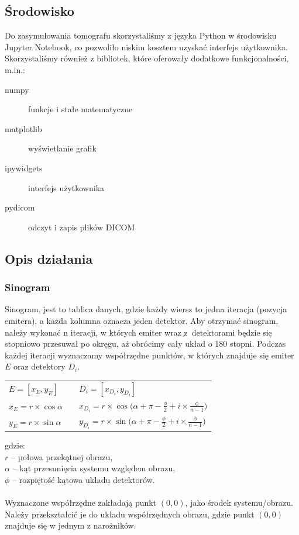 \documentclass[polish,polish,a4paper]{article}
\begin{document}
		\subsection{Środowisko}
			Do zasymulowania tomografu skorzystaliśmy z języka Python w środowisku Jupyter Notebook,
			 co pozwoliło niskim kosztem uzyskać interfejs użytkownika.
			 Skorzystaliśmy również z bibliotek, które oferowały dodatkowe funkcjonalności, m.in.:
			
			\begin{description}
				\item[numpy] funkcje i stałe matematyczne
				\item[matplotlib] wyświetlanie grafik
				\item[ipywidgets] interfejs użytkownika
				\item[pydicom] odczyt i zapis plików DICOM
			\end{description}
			
			\subsection{Opis działania}
				\subsubsection{Sinogram}
				
				Sinogram, jest to tablica danych, 
				gdzie każdy wiersz to jedna iteracja (pozycja emitera), 
				a każda kolumna oznacza jeden detektor.
				Aby otrzymać sinogram, należy wykonać n iteracji, 
				w których emiter wraz z~detektorami będzie się stopniowo przesuwał po okręgu, 
				aż obrócimy cały układ o 180 stopni. 
				Podczas każdej iteracji wyznaczamy współrzędne punktów, w których znajduje się emiter $E$ oraz detektory $D_i$.
				\begin{center}
					\begin{tabular} {l l l}
						$ E = [ x_E, y_E ] $ 	& \hspace{2cm}	 &	$ D_i = [x_{D_i}, y_{D_i}] $
						\\
						$ x_E = r \times \cos{\alpha} $ 	& \hspace{2cm}	 &	 $ x_{D_i} = r \times \cos{\big(\alpha + \pi - \frac{\phi}{2} + i \times \frac{\phi}{n-1}\big)} $
						 \\ 
						$ y_E = r \times \sin{\alpha} $ 	& \hspace{2cm}	 &	 $ y_{D_i} =  r \times \sin{\big(\alpha + \pi - \frac{\phi}{2} + i \times \frac{\phi}{n-1}\big)}$ 
						\\
					\end{tabular}
				\end{center}
				gdzie: \\
				\indent $r$ -- połowa przekątnej obrazu, \\
				\indent $\alpha$ -- kąt przesunięcia systemu względem obrazu, \\
				\indent $\phi$ -- rozpiętość kątowa układu detektorów. \\ \\
				Wyznaczone współrzędne zakładają punkt $(0,0)$, jako środek systemu/obrazu.
				 Należy przekształcić je do układu współrzędnych obrazu,
				  gdzie punkt $(0,0)$ znajduje się w jednym z narożników.
				
\end{document}
